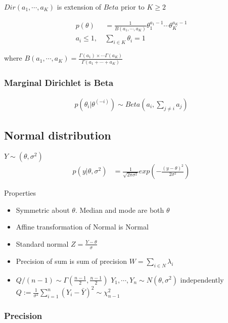     $Dir(a_1, \cdots, a_K)$ is extension of $Beta$ prior to $K \geq 2$

    \begin{align*}
        p(\theta) &= \frac{1}{B(a_1, \cdots,
            a_K)}\theta_1^{a_1-1}\cdots \theta_K^{a_K-1}\\
            a_i \leq 1,~ & \sum_{i\in K}\theta_i = 1
    \end{align*}

    where $B(a_1, \cdots, a_K) =
    \frac{\Gamma(a_1)\times\cdots\Gamma(a_K)}{\Gamma(a_1+\cdots+a_K)}$

    \subsubsection{Marginal Dirichlet is Beta}

    \begin{align*}
        p(\theta_i | \theta^{(-i)}) \sim Beta\left(a_i,
        \sum_{j\neq i} a_j\right)
    \end{align*}

    \subsection{Normal distribution}

    $Y\sim(\theta, \sigma^2)$
    \begin{align*}
        p(y|\theta, \sigma^2) &=
        \frac{1}{\sqrt{2\pi\sigma^2}}exp\left(-\frac{(y-\theta)^2}{2\sigma^2}\right)
    \end{align*}

    Properties
    \begin{itemize}
        \item Symmetric about $\theta$. Median and mode are
            both $\theta$
        \item Affine transformation of Normal is Normal
        \item Standard normal $Z = \frac{Y-\theta}{\sigma}$
        \item Precision of sum is sum of precision $W = \sum_{i\in N} \lambda_i$
        \item $Q/(n-1)\sim \Gamma(\frac{n-1}{2},
            \frac{n-1}{2})$
            \subitem $Y_1, \cdots, Y_n \sim N(\theta,
            \sigma^2)$ independently
            \subitem $Q:= \frac{1}{\sigma^2}\sum_{i=1}^n (Y_i -
            \bar{Y})^2 \sim \chi_{n-1}^2$
    \end{itemize}

    \subsubsection{Precision}

